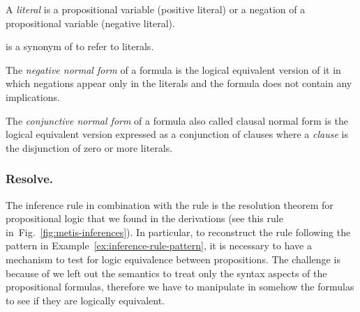 \documentclass[../../main.tex]{subfiles}
\begin{document}

\begin{mydefinition}

A \emph{literal} is a propositional variable (positive literal) or a
negation of a propositional variable (negative literal).

\end{mydefinition}

\begin{notation}
\Lit is a synonym of \Prop to refer to literals.
\end{notation}

\begin{mydefinition}

The \emph{negative normal form} of a formula is the logical
equivalent version of it in which negations appear only in the
literals and the formula does not contain any implications.

\end{mydefinition}

\begin{mydefinition}

The \emph{conjunctive normal form} of a formula also called clausal
normal form is the logical equivalent version expressed as a
conjunction of clauses where a \emph{clause} is the disjunction of
zero or more literals.
\end{mydefinition}


\subsubsection{Resolve.}
\label{sssec:resolve}

The \resolve inference rule in combination with the \simplify rule is  the
resolution theorem for propositional logic that we found in the \Metis \TSTP
derivations (see this rule in~Fig.~\ref{fig:metis-inferences}). In particular,
to reconstruct the \resolve rule following the pattern in
Example~\ref{ex:inference-rule-pattern}, it is necessary to have a mechanism to
test for logic equivalence between propositions. The challenge is because of we
left out the semantics to treat only the syntax aspects of the propositional
formulas, therefore we have to manipulate in somehow the formulas to see if they
are logically equivalent.
\end{document}
